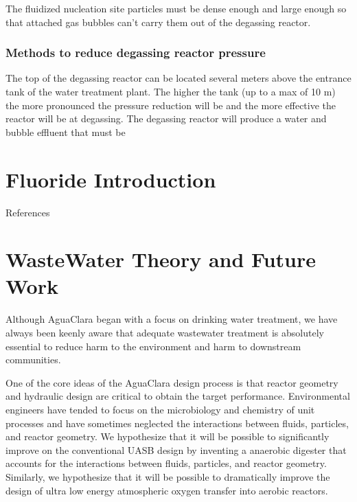 \documentclass[letterpaper,10pt,english]{sphinxmanual}
\begin{document}
The fluidized nucleation site particles must be dense enough and large enough so that attached gas bubbles can’t carry them out of the degassing reactor.


\subsection{Methods to reduce degassing reactor pressure}
\label{\detokenize{Dissolved_Gas/DG_Intro:methods-to-reduce-degassing-reactor-pressure}}
The top of the degassing reactor can be located several meters above the entrance tank of the water treatment plant. The higher the tank (up to a max of 10 m) the more pronounced the pressure reduction will be and the more effective the reactor will be at degassing. The degassing reactor will produce a water and bubble effluent that must be


\chapter{Fluoride Introduction}
\label{\detokenize{Fluoride/Fluoride_Intro:fluoride-introduction}}\label{\detokenize{Fluoride/Fluoride_Intro:title-fluoride-introduction}}\label{\detokenize{Fluoride/Fluoride_Intro::doc}}
References



\chapter{WasteWater Theory and Future Work}
\label{\detokenize{WasteWater/WW_Theory_and_Future_Work:wastewater-theory-and-future-work}}\label{\detokenize{WasteWater/WW_Theory_and_Future_Work:title-wastewater-theory-and-future-work}}\label{\detokenize{WasteWater/WW_Theory_and_Future_Work::doc}}
Although AguaClara began with a focus on drinking water treatment, we have always been keenly aware that adequate wastewater treatment is absolutely essential to reduce harm to the environment and harm to downstream communities.

One of the core ideas of the AguaClara design process is that reactor geometry and hydraulic design are critical to obtain the target performance. Environmental engineers have tended to focus on the microbiology and chemistry of unit processes and have sometimes neglected the interactions between fluids, particles, and reactor geometry. We hypothesize that it will be possible to significantly improve on the conventional UASB design by inventing a anaerobic digester that accounts for the interactions between fluids, particles, and reactor geometry. Similarly, we hypothesize that it will be possible to dramatically improve the design of ultra low energy atmospheric oxygen transfer into aerobic reactors.
\end{document}
